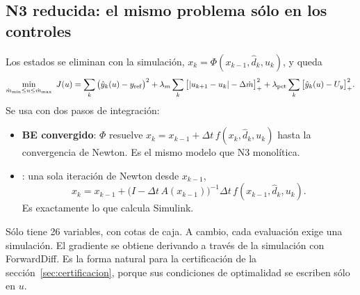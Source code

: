 \subsection{N3 reducida: el mismo problema sólo en los controles}
Los estados se eliminan con la simulación, $x_k=\Phi(x_{k-1},\hat d_k,u_k)$, y queda
\[
\min_{\dot m_{\rm min}\le u\le\dot m_{\rm max}}\ J(u)=\sum_k\big(\hat y_k(u)-y_{\rm ref}\big)^2+\lambda_m\sum_k\big[|u_{k+1}-u_k|-\Delta\dot m\big]_+^2+\lambda_{\rm pct}\sum_k\big[\hat y_k(u)-U_y\big]_+^2 .
\]
Se usa con dos pasos de integración:
\begin{itemize}
  \item \textbf{BE convergido}: $\Phi$ resuelve $x_k=x_{k-1}+\Delta t\,f(x_k,\hat d_k,u_k)$
        hasta la convergencia de Newton. Es el mismo modelo que N3 monolítica.
  \item \textbf{}: una sola iteración de Newton desde $x_{k-1}$,
        \[
        x_k=x_{k-1}+\big(I-\Delta t\,A(x_{k-1})\big)^{-1}\Delta t\,f(x_{k-1},\hat d_k,u_k).
        \]
        Es exactamente lo que calcula Simulink.
\end{itemize}
Sólo tiene 26 variables, con cotas de caja. A cambio, cada evaluación exige una simulación.
El gradiente se obtiene derivando a través de la simulación con ForwardDiff. Es la forma
natural para la certificación de la sección~\ref{sec:certificacion}, porque sus condiciones
de optimalidad se escriben sólo en $u$.

